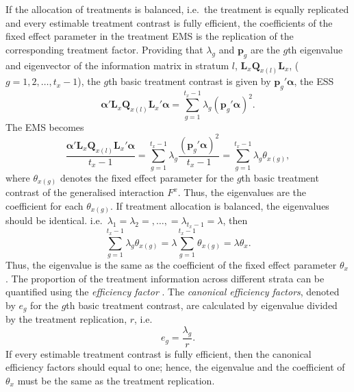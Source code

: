 \documentclass[article]{jss}
\newcommand{\Q}{\mathbf{Q}}
\newcommand{\mL}{\mathbf{L}}
\begin{document}
If the allocation of treatments is balanced, i.e.\ the treatment is equally replicated and every estimable treatment contrast is fully efficient, the coefficients of the fixed effect parameter in the treatment EMS is the replication of the corresponding treatment factor. Providing that $\lambda_g$ and $\bm{p}_g$ are the $g$th eigenvalue and eigenvector of the information matrix in stratum $l$, $ \mL_{x}\Q_{x(l)}\mL_{x}$, ($g = 1,2,\dots,t_x - 1$), the $g$th basic treatment contrast is given by $\bm{p}_g'\bm{\alpha}$, the ESS 
\begin{equation}
 \bm{\alpha}' \mL_{x}\Q_{x(l)} \mL_{x}'\bm{\alpha} = \sum^{t_x - 1}_{g = 1} \lambda_g (\bm{p}_g' \bm{\alpha})^2.
\end{equation}
The EMS becomes 
\begin{equation}
 \frac{\bm{\alpha}' \mL_{x}\Q_{x(l)} \mL_{x}'\bm{\alpha}}{t_x - 1} = \sum^{t_x - 1}_{g = 1} \lambda_g \frac{(\bm{p}_g' \bm{\alpha})^2}{t_x - 1} = \sum^{t_x - 1}_{g = 1} \lambda_g \theta_{x(g)},
\end{equation}
where $\theta_{x(g)}$ denotes the fixed effect parameter for the $g$th basic treatment contrast of the generalised interaction $F^x$. Thus, the eigenvalues are the coefficient for each $\theta_{x(g)}$. If treatment allocation is balanced, the eigenvalues should be identical. i.e.\ $\lambda_1 = \lambda_2 =,\dots,= \lambda_{t_x - 1} = \lambda$, then 
\begin{equation}
\sum^{t_x - 1}_{g = 1} \lambda_g \theta_{x(g)} = \lambda \sum^{t_x - 1}_{g = 1}\theta_{x(g)} = \lambda \theta_{x}.
\end{equation}
Thus, the eigenvalue is the same as the coefficient of the fixed effect parameter $\theta_{x}$. The proportion of the treatment information across different strata can be quantified using the \emph{efficiency factor} \citep{Yates1936}. The \emph{canonical efficiency factors}, denoted by $e_g$ for the $g$th basic treatment contrast, are calculated by eigenvalue divided by the treatment replication, $r$, i.e.\ 
\begin{equation} \label{eq:canEff}
e_g = \dfrac{\lambda_g}{r}.
\end{equation}
If every estimable treatment contrast is fully efficient, then the canonical efficiency factors should equal to one; hence, the eigenvalue and the coefficient of $\theta_{x}$  must be the same as the treatment replication. 
\end{document}
